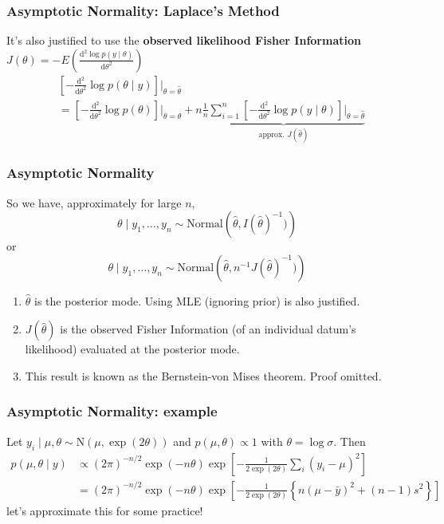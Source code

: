 \documentclass{beamer}
\begin{document}
\begin{frame}
\frametitle{Asymptotic Normality: Laplace's Method}

It's also justified to use the {\bf observed likelihood Fisher Information} $J(\theta) = -E\left(\frac{\text{d}^2 \log p(y \mid \theta) }{\text{d} \theta^2 } \right)$
\begin{align*}
&\left[-\frac{\text{d}^2}{\text{d}\theta^2} \log p(\theta \mid y)\right] \bigg|_{\theta = \hat{\theta}} \\
&=
\left[-\frac{\text{d}^2}{\text{d}\theta^2} \log p(\theta)\right] \bigg|_{\theta = \hat{\theta}} +
n \underbrace{\frac{1}{n}\sum_{i=1}^n \left[-\frac{\text{d}^2}{\text{d}\theta^2} \log p(y \mid \theta)\right] \bigg|_{\theta = \hat{\theta}}}_{ \text{approx. } J(\hat{\theta} )}
\end{align*}



\end{frame}


\begin{frame}
\frametitle{Asymptotic Normality}


So we have, approximately for large $n$,
\[
\theta \mid y_1, \ldots, y_n \sim \text{Normal}\left(\hat{\theta} , I(\hat{\theta})^{-1} )\right)
\]
or
\[
\theta \mid y_1, \ldots, y_n \sim \text{Normal}\left(\hat{\theta} , n^{-1}J(\hat{\theta})^{-1} )\right)
\]
\begin{enumerate}
\item $\hat{\theta}$ is the posterior mode. Using MLE (ignoring prior) is also justified. 
\item $J(\hat{\theta})$ is the observed Fisher Information (of an individual datum's likelihood) evaluated at the posterior mode.
\item This result is known as the Bernstein-von Mises theorem. Proof omitted.
\end{enumerate}


\end{frame}

\begin{frame}
\frametitle{Asymptotic Normality: example}

Let $y_i \mid \mu, \theta \sim \text{N}(\mu, \exp(2\theta))$ and $p(\mu, \theta) \propto 1$ with $\theta = \log \sigma$. Then 
\begin{align*}
p(\mu, \theta \mid y) &\propto (2\pi)^{-n/2} \exp(-n\theta) \exp\left[-\frac{1}{2 \exp(2\theta) } \sum_i (y_i - \mu)^2 \right] \\
&= (2\pi)^{-n/2} \exp(-n\theta) \exp\left[-\frac{1}{2 \exp(2\theta) } \left\{ n(\mu - \bar{y})^2 + (n-1)s^2 \right\} \right]
\end{align*}
let's approximate this for some practice!

\end{frame}
\end{document}
